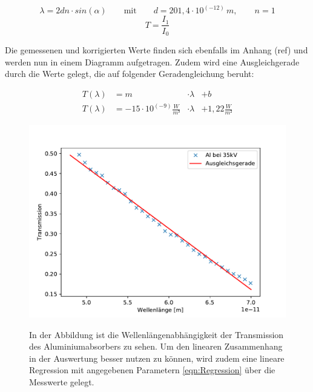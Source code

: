 \documentclass[titlepage = firstcover]{scrartcl}
\begin{document}
        \begin{equation}
            \lambda = 2dn \cdot sin(\alpha) \qquad \text{mit} \qquad d=201,4\cdot 10^{\left(-12\right)} \, m, \qquad n=1
            \label{eqn:Bragglambda}
        \end{equation}
        \begin{equation}
            T = \frac{I_1}{I_0}
            \label{eqn:Trans}
        \end{equation}
        
        \noindent
        Die gemessenen und korrigierten Werte finden sich ebenfalls im Anhang (ref) und werden nun in einem Diagramm aufgetragen. Zudem wird eine 
        Ausgleichgerade durch die Werte gelegt, die auf folgender Geradengleichung beruht:

        \begin{align}
            T\left(\lambda\right) &= m &\cdot \lambda &+ b\\
            T\left(\lambda\right) &= -15 \cdot 10^{\left(-9\right)} \frac{W}{m³} &\cdot \lambda &+ 1,22 \frac{W}{m²}
            \label{eqn:Regression}
        \end{align}

        \FloatBarrier
        \begin{figure}[h]
            \centering
            \caption{In der Abbildung ist die Wellenlängenabhängigkeit der Transmission des Aluminiumabsorbers zu sehen. Um den linearen Zusammenhang in der Auswertung besser nutzen zu können, wird zudem eine lineare Regression mit angegebenen Parametern \ref{eqn:Regression} über die Messwerte gelegt.}
            \includegraphics[width = 0.9\linewidth]{Compton_Alu.pdf}
            \label{fig:Transmission}
        \end{figure}
        \FloatBarrier
\end{document}
